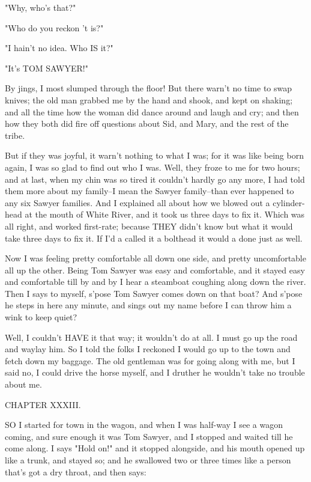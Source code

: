 "Why, who's that?"

"Who do you reckon 't is?"

"I hain't no idea.  Who IS it?"

"It's TOM SAWYER!"

By jings, I most slumped through the floor!  But there warn't no time to
swap knives; the old man grabbed me by the hand and shook, and kept on
shaking; and all the time how the woman did dance around and laugh and
cry; and then how they both did fire off questions about Sid, and Mary,
and the rest of the tribe.

But if they was joyful, it warn't nothing to what I was; for it was like
being born again, I was so glad to find out who I was.  Well, they froze
to me for two hours; and at last, when my chin was so tired it couldn't
hardly go any more, I had told them more about my family--I mean the
Sawyer family--than ever happened to any six Sawyer families.  And I
explained all about how we blowed out a cylinder-head at the mouth of
White River, and it took us three days to fix it.  Which was all right,
and worked first-rate; because THEY didn't know but what it would take
three days to fix it.  If I'd a called it a bolthead it would a done just
as well.

Now I was feeling pretty comfortable all down one side, and pretty
uncomfortable all up the other.  Being Tom Sawyer was easy and
comfortable, and it stayed easy and comfortable till by and by I hear a
steamboat coughing along down the river.  Then I says to myself, s'pose
Tom Sawyer comes down on that boat?  And s'pose he steps in here any
minute, and sings out my name before I can throw him a wink to keep
quiet?

Well, I couldn't HAVE it that way; it wouldn't do at all.  I must go up
the road and waylay him.  So I told the folks I reckoned I would go up to
the town and fetch down my baggage.  The old gentleman was for going
along with me, but I said no, I could drive the horse myself, and I
druther he wouldn't take no trouble about me.




CHAPTER XXXIII.

SO I started for town in the wagon, and when I was half-way I see a wagon
coming, and sure enough it was Tom Sawyer, and I stopped and waited till
he come along.  I says "Hold on!" and it stopped alongside, and his mouth
opened up like a trunk, and stayed so; and he swallowed two or three
times like a person that's got a dry throat, and then says:

